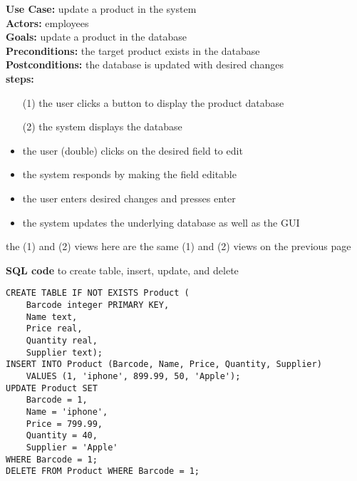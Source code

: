 \documentclass[notitlepage,11pt]{article}
\begin{document}
\textbf{Use Case:} update a product in the system\\
\textbf{Actors:} employees\\
\textbf{Goals:} update a product in the database\\
\textbf{Preconditions:} the target product exists in the database\\
\textbf{Postconditions:} the database is updated with desired changes\\
\textbf{steps:}
	\begin{itemize}
		\item[(1)] the user clicks a button to display the product database
		\item[(2)] the system displays the database
		\item the user (double) clicks on the desired field to edit
		\item the system responds by making the field editable
		\item the user enters desired changes and presses enter
		\item the system updates the underlying database as well as the GUI
	\end{itemize}
the (1) and (2) views here are the same (1) and (2) views on the previous page

\textbf{SQL code} to create table, insert, update, and delete
\Suppressnumber
\begin{lstlisting}
CREATE TABLE IF NOT EXISTS Product (
	Barcode integer PRIMARY KEY,
	Name text,
	Price real,
	Quantity real,
	Supplier text);
INSERT INTO Product (Barcode, Name, Price, Quantity, Supplier)
	VALUES (1, 'iphone', 899.99, 50, 'Apple');
UPDATE Product SET 
	Barcode = 1,
	Name = 'iphone',
	Price = 799.99,
	Quantity = 40,
	Supplier = 'Apple' 
WHERE Barcode = 1;
DELETE FROM Product WHERE Barcode = 1;
\end{lstlisting}
\newpage
\end{document}
